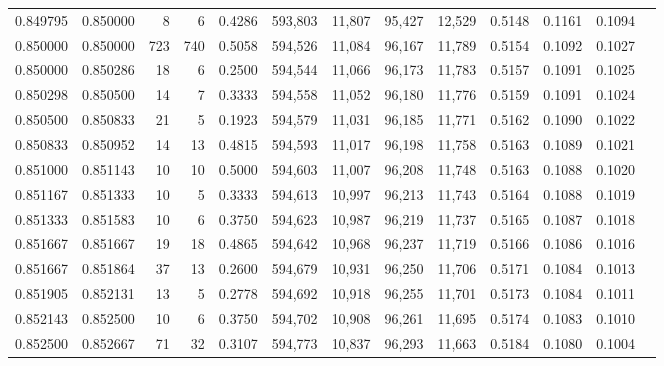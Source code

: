 \begin{tabular}{rrrrrrrrrrrrr}
0.849795 & 0.850000 &     8 &   6 &                                     0.4286 & 593,803 &  11,807 &  95,427 &  12,529 & 0.5148 & 0.1161 & 0.1094 \\
0.850000 & 0.850000 &   723 & 740 &                                     0.5058 & 594,526 &  11,084 &  96,167 &  11,789 & 0.5154 & 0.1092 & 0.1027 \\
0.850000 & 0.850286 &    18 &   6 &                                     0.2500 & 594,544 &  11,066 &  96,173 &  11,783 & 0.5157 & 0.1091 & 0.1025 \\
0.850298 & 0.850500 &    14 &   7 &                                     0.3333 & 594,558 &  11,052 &  96,180 &  11,776 & 0.5159 & 0.1091 & 0.1024 \\
0.850500 & 0.850833 &    21 &   5 &                                     0.1923 & 594,579 &  11,031 &  96,185 &  11,771 & 0.5162 & 0.1090 & 0.1022 \\
0.850833 & 0.850952 &    14 &  13 &                                     0.4815 & 594,593 &  11,017 &  96,198 &  11,758 & 0.5163 & 0.1089 & 0.1021 \\
0.851000 & 0.851143 &    10 &  10 &                                     0.5000 & 594,603 &  11,007 &  96,208 &  11,748 & 0.5163 & 0.1088 & 0.1020 \\
0.851167 & 0.851333 &    10 &   5 &                                     0.3333 & 594,613 &  10,997 &  96,213 &  11,743 & 0.5164 & 0.1088 & 0.1019 \\
0.851333 & 0.851583 &    10 &   6 &                                     0.3750 & 594,623 &  10,987 &  96,219 &  11,737 & 0.5165 & 0.1087 & 0.1018 \\
0.851667 & 0.851667 &    19 &  18 &                                     0.4865 & 594,642 &  10,968 &  96,237 &  11,719 & 0.5166 & 0.1086 & 0.1016 \\
0.851667 & 0.851864 &    37 &  13 &                                     0.2600 & 594,679 &  10,931 &  96,250 &  11,706 & 0.5171 & 0.1084 & 0.1013 \\
0.851905 & 0.852131 &    13 &   5 &                                     0.2778 & 594,692 &  10,918 &  96,255 &  11,701 & 0.5173 & 0.1084 & 0.1011 \\
0.852143 & 0.852500 &    10 &   6 &                                     0.3750 & 594,702 &  10,908 &  96,261 &  11,695 & 0.5174 & 0.1083 & 0.1010 \\
0.852500 & 0.852667 &    71 &  32 &                                     0.3107 & 594,773 &  10,837 &  96,293 &  11,663 & 0.5184 & 0.1080 & 0.1004 \\

\end{tabular}
